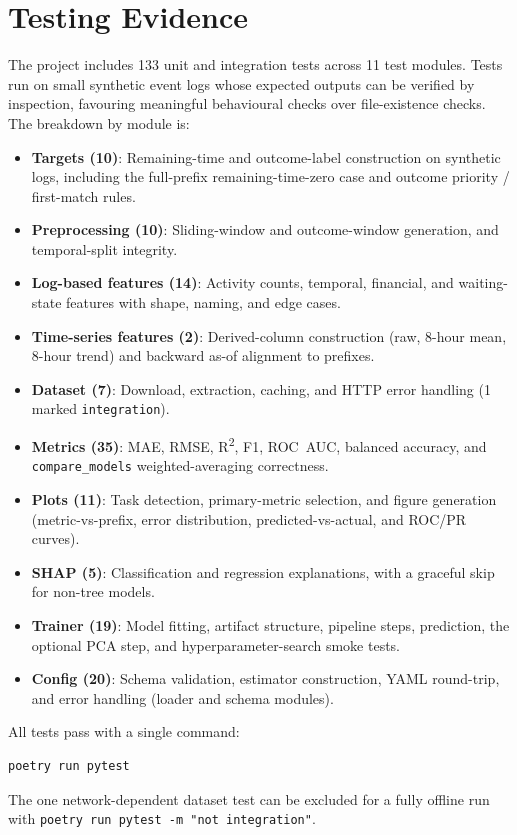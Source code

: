 \documentclass[runningheads]{llncs}
\begin{document}
\section{Testing Evidence}
\label{sec:testing}
The project includes 133 unit and integration tests across 11 test
modules. Tests run on small synthetic event logs whose expected outputs can be
verified by inspection, favouring meaningful behavioural checks over
file-existence checks. The breakdown by module is:
\begin{itemize}
    \item \textbf{Targets (10)}: Remaining-time and outcome-label
          construction on synthetic logs, including the full-prefix
          remaining-time-zero case and outcome priority / first-match rules.
    \item \textbf{Preprocessing (10)}: Sliding-window and
          outcome-window generation, and temporal-split integrity.
    \item \textbf{Log-based features (14)}: Activity counts,
          temporal, financial, and waiting-state features
          with shape, naming, and edge cases.
    \item \textbf{Time-series features (2)}: Derived-column
          construction (raw, 8-hour mean, 8-hour trend) and
          backward as-of alignment to prefixes.
    \item \textbf{Dataset (7)}: Download, extraction, caching,
          and HTTP error handling (1 marked \texttt{integration}).
    \item \textbf{Metrics (35)}: MAE, RMSE, R\textsuperscript{2},
          F1, ROC~AUC, balanced accuracy, and \texttt{compare\_models}
          weighted-averaging correctness.
    \item \textbf{Plots (11)}: Task detection, primary-metric
          selection, and figure generation (metric-vs-prefix,
          error distribution, predicted-vs-actual, and ROC/PR curves).
    \item \textbf{SHAP (5)}: Classification and regression
          explanations, with a graceful skip for non-tree models.
    \item \textbf{Trainer (19)}: Model fitting, artifact structure,
          pipeline steps, prediction, the optional PCA step, and
          hyperparameter-search smoke tests.
    \item \textbf{Config (20)}: Schema validation, estimator
          construction, YAML round-trip, and error handling
          (loader and schema modules).
\end{itemize}
All tests pass with a single command:
\begin{verbatim}
poetry run pytest
\end{verbatim}
The one network-dependent dataset test can be excluded for a fully offline run
with \texttt{poetry run pytest -m "not integration"}.
\end{document}
